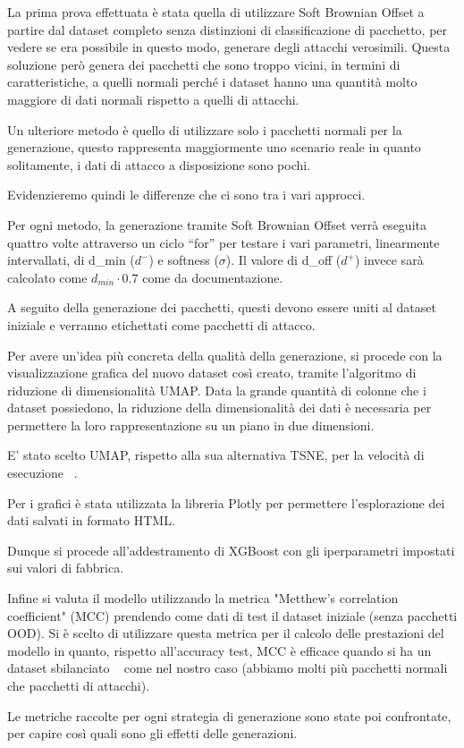 La prima prova effettuata è stata quella di utilizzare Soft Brownian Offset a partire dal dataset completo senza distinzioni di classificazione di pacchetto, per vedere se era possibile in questo modo, generare degli attacchi verosimili. Questa soluzione però genera dei pacchetti che sono troppo vicini, in termini di caratteristiche, a quelli normali perché i dataset hanno una quantità molto maggiore di dati normali rispetto a quelli di attacchi.

Un ulteriore metodo è quello di utilizzare solo i pacchetti normali per la generazione, questo rappresenta maggiormente uno scenario reale in quanto solitamente, i dati di attacco a disposizione sono pochi.

Evidenzieremo quindi le differenze che ci sono tra i vari approcci.

Per ogni metodo, la generazione tramite Soft Brownian Offset verrà eseguita quattro volte attraverso un ciclo ``for'' per testare i vari parametri, linearmente intervallati, di d\_min ($d^{-}$) e softness ($\sigma$). Il valore di d\_off ($d^{+}$) invece sarà calcolato come $d_{min} \cdot 0.7$ come da documentazione.

A seguito della generazione dei pacchetti, questi devono essere uniti al dataset iniziale e verranno etichettati come pacchetti di attacco.

Per avere un'idea più concreta della qualità della generazione, si procede con la visualizzazione grafica del nuovo dataset così creato, tramite l'algoritmo di riduzione di dimensionalità UMAP. Data la grande quantità di colonne che i dataset possiedono, la riduzione della dimensionalità dei dati è necessaria per permettere la loro rappresentazione su un piano in due dimensioni.

E' stato scelto UMAP, rispetto alla sua alternativa TSNE, per la velocità di esecuzione ~\cite{umap}.

Per i grafici è stata utilizzata la libreria Plotly per permettere l'esplorazione dei dati salvati in formato HTML.


Dunque si procede all'addestramento di XGBoost con gli iperparametri impostati sui valori di fabbrica.

Infine si valuta il modello utilizzando la metrica "Metthew's correlation coefficient" (MCC) prendendo come dati di test il dataset iniziale (senza pacchetti OOD).
Si è scelto di utilizzare questa metrica per il calcolo delle prestazioni del modello in quanto, rispetto all'accuracy test, MCC è efficace quando si ha un dataset sbilanciato  ~\cite{chiccoAdvantagesMatthewsCorrelation2020} come nel nostro caso (abbiamo molti più pacchetti normali che pacchetti di attacchi).

Le metriche raccolte per ogni strategia di generazione sono state poi confrontate, per capire così quali sono gli effetti delle generazioni.
